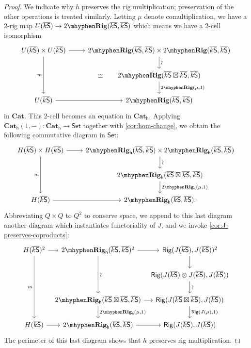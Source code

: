 \documentclass[12pt,reqno]{amsart}
\theoremstyle{plain}
\theoremstyle{definition}
\theoremstyle{remark}
\newcommand{\maps}{\colon}
\newcommand{\category}[1]{\mathsf{#1}}
\renewcommand{\S}{\category S}
\newcommand{\namedcat}[1]{\mathsf{#1}}
\newcommand{\Rig}{\namedcat{Rig}}
\newcommand{\Set}{\namedcat{Set}}
\newcommand{\TRig}{2\mhyphen\namedbicat{Rig}}
\newcommand{\namedbicat}[1]{\mathbf{#1}}
\newcommand{\CCat}{\namedbicat{Cat}}
\newcommand{\ho}{_\mathsf{h}}
\newcommand{\ksbar}{\overline{k\S}}
\numberwithin{thm}{section}
\begin{document}
\begin{proof}
    We indicate why $h$ preserves the rig multiplication; preservation of the other operations is treated similarly. Letting $\mu$ denote comultiplication, we have a 2-rig map $U(\ksbar) \to \TRig(\ksbar, \ksbar)$ which means we have a 2-cell isomorphism 
    \[
    \begin{tikzcd}
        U(\ksbar) \times U(\ksbar)
        \arrow[r]
        \arrow[dd, swap, "m"]
        &
        \TRig(\ksbar, \ksbar) \times \TRig(\ksbar, \ksbar)
        \arrow[d, sloped, "\sim"]
        \\&
        \TRig(\ksbar \boxtimes \ksbar, \ksbar)
        \arrow[d, "{\TRig(\mu, 1)}"]
        \\
        U(\ksbar)
        \arrow[uur, phantom, "\cong"]
        \arrow[r]
        & 
        \TRig(\ksbar, \ksbar)
    \end{tikzcd}
    \]
    in $\CCat$. This 2-cell becomes an equation in $\CCat\ho$. Applying $
    \CCat\ho(1, -) \maps \CCat\ho \to \Set$ 
    together with \cref{cor:hom-change}, we obtain the following commutative diagram in $\Set$:
    \[
    \begin{tikzcd}
        H(\ksbar) \times H(\ksbar)
        \arrow[r]
        \arrow[dd, swap, "m"]
        &
        \TRig\ho(\ksbar, \ksbar) \times \TRig\ho(\ksbar, \ksbar)
        \arrow[d, sloped, "\sim"]
        \\&
        \TRig\ho(\ksbar \boxtimes \ksbar, \ksbar)
        \arrow[d, "{\TRig\ho(\mu, 1)}"]
        \\
        H(\ksbar)
        \arrow[r]
        & 
        \TRig\ho(\ksbar, \ksbar).
    \end{tikzcd}
    \]
    Abbreviating $Q \times Q$ to $Q^2$ to conserve space, we append to this last diagram another diagram which instantiates functoriality of $J$, and we invoke \cref{cor:J-preserves-coproducts}: 
    \[
    \begin{tikzcd}[column sep = tiny]
        H(\ksbar)^2
        \arrow[r]
        \arrow[ddd, swap, "m"]
        &
        \TRig\ho(\ksbar, \ksbar)^2
        \arrow[dd, sloped, "\sim"]
        \arrow[r]
        &
        \Rig(J(\ksbar), J(\ksbar))^2
        \arrow[d]
        \\&
        &
        \Rig(J(\ksbar)\otimes J(\ksbar), J(\ksbar))
        \arrow[d, sloped, "\sim"]
        \\
        & 
        \TRig\ho(\ksbar \boxtimes \ksbar, \ksbar)
        \arrow[d, "{\TRig\ho(\mu, 1)}"]
        \arrow[r]
        &
        \Rig(J(\ksbar \boxtimes \ksbar), J(\ksbar))
        \arrow[d, "{\Rig(J(\mu), 1)}"]
        \\
        H(\ksbar)
        \arrow[r]
        &
        \TRig\ho(\ksbar, \ksbar)
        \arrow[r]
        &
        \Rig(J(\ksbar), J(\ksbar))
    \end{tikzcd}
    \]
    The perimeter of this last diagram shows that $h$ preserves rig multiplication. 
\end{proof}
\end{document}
